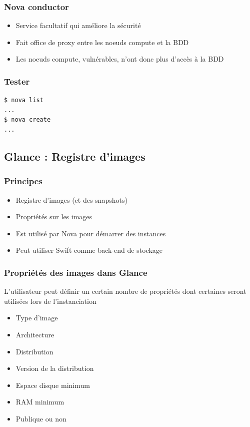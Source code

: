   \begin{frame}
    \frametitle{Nova conductor}
    \begin{itemize}
      \item Service facultatif qui améliore la sécurité
      \item Fait office de proxy entre les noeuds compute et la BDD
      \item Les noeuds compute, vulnérables, n'ont donc plus d'accès à la BDD
    \end{itemize}
  \end{frame}

  \begin{frame}[containsverbatim]
    \frametitle{Tester}
\begin{verbatim}
$ nova list
...
$ nova create
...
\end{verbatim}
  \end{frame}

  \subsection[Glance]{Glance : Registre d'images}

  \begin{frame}
    \frametitle{Principes}
    \begin{itemize}
      \item Registre d'images (et des snapshots)
      \item Propriétés sur les images
      \item Est utilisé par Nova pour démarrer des instances
      \item Peut utiliser Swift comme back-end de stockage
    \end{itemize}
  \end{frame}

  \begin{frame}
    \frametitle{Propriétés des images dans Glance}
    L'utilisateur peut définir un certain nombre de propriétés dont certaines seront utilisées lors de l'instanciation
    \begin{itemize}
      \item Type d'image
      \item Architecture
      \item Distribution
      \item Version de la distribution
      \item Espace disque minimum
      \item RAM minimum
      \item Publique ou non
    \end{itemize}
  \end{frame}

